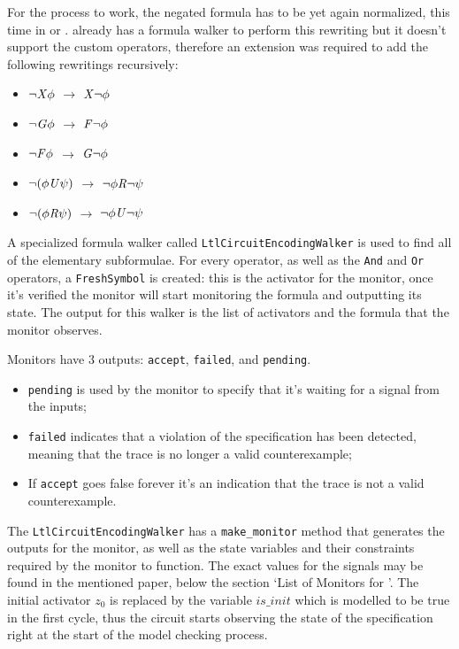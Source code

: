 For the process to work, the negated formula has to be yet again normalized, this time in \nnf{} or \NNF{}. \pysmt{} already has a formula walker to perform this rewriting but it doesn't support the custom \ltl{} operators, therefore an extension was required to add the following rewritings recursively:
\begin{itemize}
    \item $\lnot \mathit{X}{} \phi$ $\longrightarrow$ $\mathit{X} \lnot \phi$
    \item $\lnot \mathit{G}{} \phi$ $\longrightarrow$ $\mathit{F} \lnot \phi$
    \item $\lnot \mathit{F}{} \phi$ $\longrightarrow$ $\mathit{G} \lnot \phi$
    \item $\lnot (\phi \mathit{U}{} \psi)$ $\longrightarrow$ $\lnot \phi \mathit{R} \lnot \psi$
    \item $\lnot (\phi \mathit{R}{} \psi)$ $\longrightarrow$ $\lnot \phi \mathit{U} \lnot \psi$
\end{itemize}

A specialized formula walker called \texttt{LtlCircuitEncodingWalker} is used to find all of the elementary subformulae.
For every \ltl{} operator, as well as the \texttt{And} and \texttt{Or} operators, a \texttt{FreshSymbol} is created: this is the activator for the monitor, once it's verified the monitor will start monitoring the formula and outputting its state.
The output for this walker is the list of activators and the formula that the monitor observes.

Monitors have 3 outputs: \texttt{accept}, \texttt{failed}, and \texttt{pending}.
\begin{itemize}
    \item \texttt{pending} is used by the monitor to specify that it's waiting for a signal from the inputs;
    \item \texttt{failed} indicates that a violation of the specification has been detected, meaning that the trace is no longer a valid counterexample;
    \item If \texttt{accept} goes false forever it's an indication that the trace is not a valid counterexample.
\end{itemize}

The \texttt{LtlCircuitEncodingWalker} has a \texttt{make\_monitor} method that generates the outputs for the monitor, as well as the state variables and their constraints required by the monitor to function.
The exact values for the signals may be found in the mentioned paper, below the section `List of Monitors for \pltl'.
The initial activator $\mathit{z_0}$ is replaced by the variable $\mathit{is\_init}$ which is modelled to be true in the first cycle, thus the circuit starts observing the state of the specification right at the start of the model checking process.

